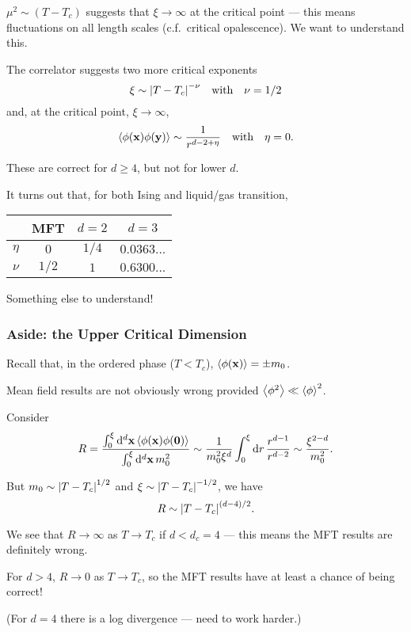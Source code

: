 \documentclass[a4paper,11pt]{article}
\begin{document}
	$\mu^2 \sim (T - T_c)$ suggests that $\xi \to \infty$ at the critical point --- this means fluctuations on all length scales (c.f.\ critical opalescence). We want to understand this.

	The correlator suggests two more critical exponents
	\[
		\xi \sim \abs{T - T_c}^{-\nu} \quad \text{with} \quad \nu = 1/2
	\]
	and, at the critical point, $\xi \to \infty$,
	\[
		\expval{\phi(\vb x)\phi(\vb y)} \sim \frac{1}{r ^{d-2+\eta}} \quad \text{with} \quad \eta = 0.
	\]
	
	These are correct for $d \geq 4$, but not for lower $d$.

	It turns out that, for both Ising and liquid/gas transition,
	\begin{center}
		\begin{tabular}{c|ccc}
			& MFT & $d=2$ & $d=3$\\
			\hline
			$\eta$ & $0$  & $1/4$ & $0.0363...$ \\
			$\nu$ & $1/2$ & $1$ & $0.6300...$ 
		\end{tabular}
	\end{center}
	
	Something else to understand!

	\subsubsection{Aside: the Upper Critical Dimension}

	Recall that, in the ordered phase ($T < T_c$), $\expval{\phi(\vb x)} = \pm m_0$.

	Mean field results are not obviously wrong provided $\expval{\phi^2} \ll \expval{\phi}^2$.
	
	Consider
	\[
		R = \frac{\int_{0}^{\xi}\dd[d]{\vb x} \expval{\phi(\vb x)\phi(\vb 0)}}{\int_{0}^{\xi}\dd[d]{\vb x} m_0^2} \sim \frac{1}{m_0^2 \xi^d} \int_{0}^{\xi} \dd{r} \frac{r ^{d-1}}{r ^{d-2}} \sim \frac{\xi ^{2-d}}{m_0^2}.
	\]

	But $m_0 \sim \abs{T- T_c}^{1/2}$ and $\xi \sim \abs{T - T_c}^{-1/2}$, we have
	\[
		R \sim \abs{T - T_c}^{(d-4)/2}.
	\]
	
	We see that $R \to \infty$ as $T \to T_c$ if $d < d_c = 4$ --- this means the MFT results are definitely wrong.

	For $d > 4$, $R \to 0$ as $T \to T_c$, so the MFT results have at least a chance of being correct!

	(For $d=4$ there is a log divergence --- need to work harder.)
	
\end{document}
